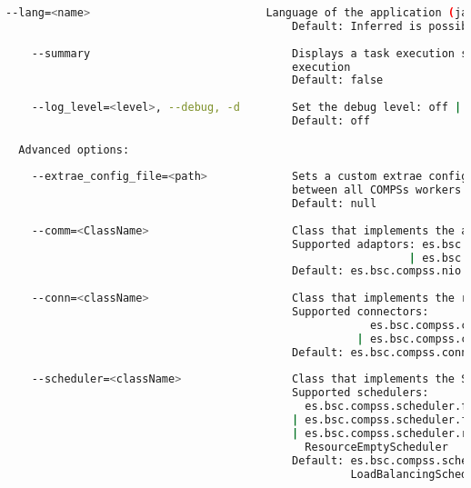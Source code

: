 \begin{lstlisting}[language=bash]
    --lang=<name>                           Language of the application (java/c/python)
                                            Default: Inferred is possible. Otherwise: java
                                            
    --summary                               Displays a task execution summary at the end of the application
                                            execution
                                            Default: false
                                            
    --log_level=<level>, --debug, -d        Set the debug level: off | info | debug
                                            Default: off

  Advanced options:
  
    --extrae_config_file=<path>             Sets a custom extrae config file. Must be in a shared disk
                                            between all COMPSs workers.
                                            Default: null
                                            
    --comm=<ClassName>                      Class that implements the adaptor for communications
                                            Supported adaptors: es.bsc.compss.nio.master.NIOAdaptor
                                                              | es.bsc.compss.gat.master.GATAdaptor
                                            Default: es.bsc.compss.nio.master.NIOAdaptor
                                            
    --conn=<className>                      Class that implements the runtime connector for the cloud
                                            Supported connectors: 
                                                        es.bsc.compss.connectors.DefaultSSHConnector
                                                      | es.bsc.compss.connectors.DefaultNoSSHConnector
                                            Default: es.bsc.compss.connectors.DefaultSSHConnector
                                            
    --scheduler=<className>                 Class that implements the Scheduler for COMPSs
                                            Supported schedulers: 
                                              es.bsc.compss.scheduler.fullGraphScheduler.FullGraphScheduler
                                            | es.bsc.compss.scheduler.fifoScheduler.FIFOScheduler
                                            | es.bsc.compss.scheduler.resourceEmptyScheduler.
                                              ResourceEmptyScheduler
                                            Default: es.bsc.compss.scheduler.loadBalancingScheduler.
                                                     LoadBalancingScheduler
                                            

\end{lstlisting}
